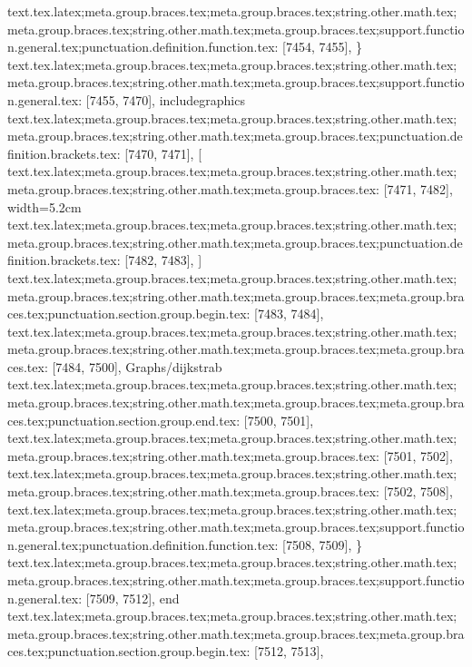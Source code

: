 {{{{{{{{{{{{{{{{{{{{{{{{{{{{{{{{{{{{{{{{{{{{{{{{{{{{{{{{{{{{{{{{{{{{{{{{{{{{{{{{{{{{{{{{{{{{{{{{{{{{{{{{{{{{{{{{{{{{{{{{{{{{{{{{{{{{{{{{{{{{{{{{{{{{{{{{{{{{{{{{{{{{{{{{{{{{{{{{{{{{{{{{{{{{{{{{{{{{{{{{{{text.tex.latex;meta.group.braces.tex;meta.group.braces.tex;string.other.math.tex;meta.group.braces.tex;string.other.math.tex;meta.group.braces.tex;support.function.general.tex;punctuation.definition.function.tex: [7454, 7455], {\}
text.tex.latex;meta.group.braces.tex;meta.group.braces.tex;string.other.math.tex;meta.group.braces.tex;string.other.math.tex;meta.group.braces.tex;support.function.general.tex: [7455, 7470], {includegraphics}
text.tex.latex;meta.group.braces.tex;meta.group.braces.tex;string.other.math.tex;meta.group.braces.tex;string.other.math.tex;meta.group.braces.tex;punctuation.definition.brackets.tex: [7470, 7471], {[}
text.tex.latex;meta.group.braces.tex;meta.group.braces.tex;string.other.math.tex;meta.group.braces.tex;string.other.math.tex;meta.group.braces.tex: [7471, 7482], {width=5.2cm}
text.tex.latex;meta.group.braces.tex;meta.group.braces.tex;string.other.math.tex;meta.group.braces.tex;string.other.math.tex;meta.group.braces.tex;punctuation.definition.brackets.tex: [7482, 7483], {]}
text.tex.latex;meta.group.braces.tex;meta.group.braces.tex;string.other.math.tex;meta.group.braces.tex;string.other.math.tex;meta.group.braces.tex;meta.group.braces.tex;punctuation.section.group.begin.tex: [7483, 7484], {{}
text.tex.latex;meta.group.braces.tex;meta.group.braces.tex;string.other.math.tex;meta.group.braces.tex;string.other.math.tex;meta.group.braces.tex;meta.group.braces.tex: [7484, 7500], {Graphs/dijkstrab}
text.tex.latex;meta.group.braces.tex;meta.group.braces.tex;string.other.math.tex;meta.group.braces.tex;string.other.math.tex;meta.group.braces.tex;meta.group.braces.tex;punctuation.section.group.end.tex: [7500, 7501], {}}
text.tex.latex;meta.group.braces.tex;meta.group.braces.tex;string.other.math.tex;meta.group.braces.tex;string.other.math.tex;meta.group.braces.tex: [7501, 7502], {
}
text.tex.latex;meta.group.braces.tex;meta.group.braces.tex;string.other.math.tex;meta.group.braces.tex;string.other.math.tex;meta.group.braces.tex: [7502, 7508], {      }
text.tex.latex;meta.group.braces.tex;meta.group.braces.tex;string.other.math.tex;meta.group.braces.tex;string.other.math.tex;meta.group.braces.tex;support.function.general.tex;punctuation.definition.function.tex: [7508, 7509], {\}
text.tex.latex;meta.group.braces.tex;meta.group.braces.tex;string.other.math.tex;meta.group.braces.tex;string.other.math.tex;meta.group.braces.tex;support.function.general.tex: [7509, 7512], {end}
text.tex.latex;meta.group.braces.tex;meta.group.braces.tex;string.other.math.tex;meta.group.braces.tex;string.other.math.tex;meta.group.braces.tex;meta.group.braces.tex;punctuation.section.group.begin.tex: [7512, 7513], {{}
}}}}}}}}}}}}}}}}}}}}}}}}}}}}}}}}}}}}}}}}}}}}}}}}}}}}}}}}}}}}}}}}}}}}}}}}}}}}}}}}}}}}}}}}}}}}}}}}}}}}}}}}}}}}}}}}}}}}}}}}}}}}}}}}}}}}}}}}}}}}}}}}}}}}}}}}}}}}}}}}}}}}}}}}}}}}}}}}}}}}}}}}}}}}}}}}}}}}}}}}}}}}}
